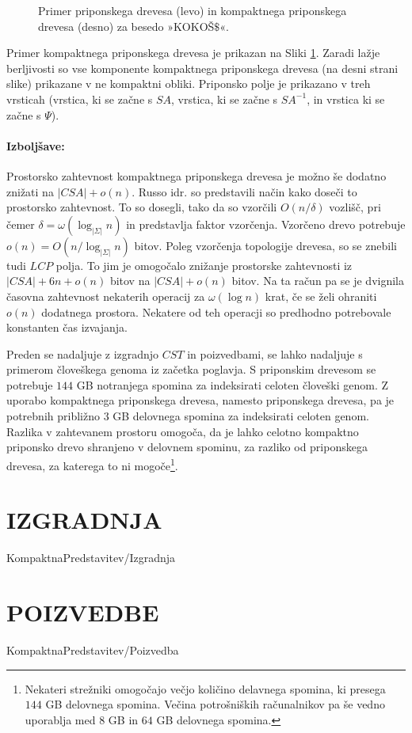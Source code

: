 \begin{figure}[tb]
    \begin{center}
        
        \caption{Primer priponskega drevesa (levo) in kompaktnega priponskega drevesa (desno) za besedo »KOKOŠ$\$$«.} 
        \label{fig:CST}
    \end{center}
\end{figure}

Primer kompaktnega priponskega drevesa je prikazan na Sliki \ref{fig:CST}. Zaradi lažje berljivosti so vse komponente kompaktnega priponskega drevesa (na desni strani slike) prikazane v ne kompaktni obliki. Priponsko polje je prikazano v treh vrsticah (vrstica, ki se začne s $SA$, vrstica, ki se začne s $SA^{-1}$, in vrstica ki se začne s $\Psi$).

\paragraph{Izboljšave:}
Prostorsko zahtevnost kompaktnega priponskega drevesa je možno še dodatno znižati na $|CSA|+o(n)$. Russo idr. \cite{Russo2008} so predstavili način kako doseči to prostorsko zahtevnost. To so dosegli, tako da so vzorčili $O(n/\delta)$ vozlišč, pri čemer $\delta=\omega(\log_{|\Sigma|}{n})$ in predstavlja faktor vzorčenja. Vzorčeno drevo potrebuje $o(n)=O(n/\log_{|\Sigma|}{n})$ bitov. Poleg vzorčenja topologije drevesa, so se znebili tudi $LCP$ polja. To jim je omogočalo znižanje prostorske zahtevnosti iz $|CSA|+6n+o(n)$ bitov na $|CSA|+o(n)$ bitov. Na ta račun pa se je dvignila časovna zahtevnost nekaterih operacij za $\omega(\log{n})$ krat, če se želi ohraniti $o(n)$ dodatnega prostora. Nekatere od teh operacji so predhodno potrebovale konstanten čas izvajanja.

Preden se nadaljuje z izgradnjo $CST$ in poizvedbami, se lahko nadaljuje s primerom človeškega genoma iz začetka poglavja. S priponskim drevesom se potrebuje $144$ GB notranjega spomina za indeksirati celoten človeški genom. Z  uporabo kompaktnega priponskega drevesa, namesto priponskega drevesa, pa je potrebnih približno $3$ GB delovnega spomina za indeksirati celoten genom. Razlika v zahtevanem prostoru omogoča, da je lahko celotno kompaktno priponsko drevo shranjeno v delovnem spominu, za razliko od priponskega drevesa, za katerega to ni mogoče\footnote{Nekateri strežniki omogočajo večjo količino delavnega spomina, ki presega $144$ GB delovnega spomina. Večina potrošniških računalnikov pa še vedno uporablja med $8$ GB in $64$ GB delovnega spomina.}.

\section{IZGRADNJA}\label{sec:CSTizgradnja}
{KompaktnaPredstavitev/Izgradnja}

\section{POIZVEDBE}\label{sec:CSTpoizvedba}
{KompaktnaPredstavitev/Poizvedba}


